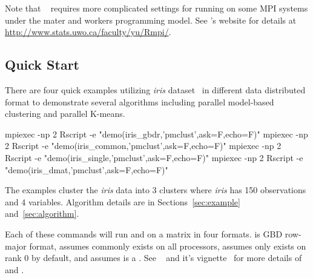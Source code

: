 Note that ~\citep{Yu2010}
requires more complicated settings for running on
some MPI systems under the mater and workers programming model.
See 's website for details at
\url{http://www.stats.uwo.ca/faculty/yu/Rmpi/}.




\subsection[Quick Start]{Quick Start}
\label{sec:quick}

There are four quick examples utilizing {\it iris} dataset~\citep{Fisher1936}
in different data distributed format to demonstrate several algorithms
including parallel model-based clustering and parallel K-means.
\begin{Command}
mpiexec -np 2 Rscript -e "demo(iris_gbdr,'pmclust',ask=F,echo=F)"
mpiexec -np 2 Rscript -e "demo(iris_common,'pmclust',ask=F,echo=F)"
mpiexec -np 2 Rscript -e "demo(iris_single,'pmclust',ask=F,echo=F)"
mpiexec -np 2 Rscript -e "demo(iris_dmat,'pmclust',ask=F,echo=F)"
\end{Command}
The examples cluster the {\it iris} data into 3 clusters where
{\it iris} has 150 observations and 4 variables.
Algorithm details are in Sections~\ref{sec:example} and~\ref{sec:algorithm}.

Each of these commands will run  and  on
a matrix  in four formats.
 is GBD row-major format,
 assumes  commonly exists on all processors,
 assumes  only exists on rank 0 by default, and
 assumes  is a .
See ~\citep{Schmidt2013pbdDEMOpackage} and it's
vignette~\citep{Schmidt2013pbdDEMOvignette}
for more details of  and .


